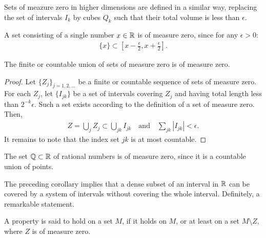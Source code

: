 \begin{definition}
  \label{def:zero-set-2}
  Sets of meazure zero in higher dimensions are defined in a similar
  way, replacing the set of intervals $I_k$ by cubes $Q_k$ such that
  their total volume is less than $\epsilon$.
\end{definition}

\begin{example}
  A set consisting of a single number $x\in\mathbb R$ is of measure zero,
  since for any $\epsilon>0$:
  \begin{gather*}
    \{x\} \subset \left[x-\tfrac\epsilon2,x+\tfrac\epsilon2\right].  
  \end{gather*}
\end{example}

\begin{lemma}
  The finite or countable union of sets of measure zero is of measure
  zero.
\end{lemma}

\begin{proof}
  Let $\{Z_j\}_{j=1,2,\dots}$ be a finite or countable sequence of
  sets of measure zero. For each $Z_j$, let $\{I_{jk}\}$ be a set of
  intervals covering $Z_j$ and having total length less than
  $2^{-k}\epsilon$. Such a set exists according to the definition of
  a set of measure zero. Then,
  \begin{gather*}
    Z = \bigcup_j Z_j \subset \bigcup_{jk} I_{jk}
    \quad\text{and}\quad
    \sum_{jk} |I_{jk}| < \epsilon.
  \end{gather*}
  It remains to note that the index set $jk$ is at most countable.
\end{proof}

\begin{corollary}
  The set $\mathbb Q\subset \mathbb R$ of rational numbers is of measure zero, since
  it is a countable union of points.
\end{corollary}

\begin{note}
  The preceding corollary implies that a dense subset of an interval
  in $\mathbb R$ can be covered by a system of intervals without covering the
  whole interval. Definitely, a remarkable statement.
\end{note}

\begin{definition}
  \label{def:almost-everywhere}
  A property is said to hold  on a set $M$,
  if it holds on $M$, or at least on a set $M\setminus Z$, where $Z$
  is of measure zero.
\end{definition}

